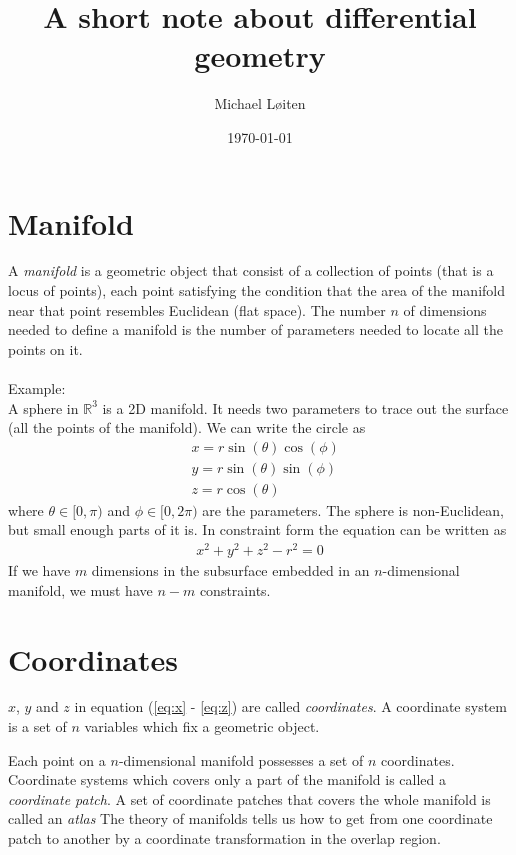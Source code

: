 \documentclass[a4paper, 12pt]{article}
\title{\vspace{-8ex}A short note about differential geometry\vspace{-1ex}}
\author{Michael L{\o}iten}
\date{\vspace{-2ex}\today}
\begin{document}
\maketitle

\section{Manifold}
A \emph{manifold} is a geometric object that consist of a collection of points 
(that is a locus of points), each point satisfying the condition that the area 
of the manifold near that point resembles Euclidean (flat space). The number $n$ 
of dimensions needed to define a manifold is the number of parameters needed to 
locate all the points on it.\\
\\
Example:\\
A sphere in $\mathbb{R}^3$ is a 2D manifold. It needs two parameters to 
trace out the surface (all the points of the manifold). We can write the circle 
as
%
\begin{align}
 &x = r\sin(\theta)\cos(\phi) \label{eq:x}\\
 &y = r\sin(\theta)\sin(\phi) \label{eq:y}\\
 &z = r\cos(\theta) \label{eq:z}
\end{align}
%
where $\theta \in [0,\pi)$ and $\phi \in [0,2\pi)$ are the parameters. The 
sphere is non-Euclidean, but small enough parts of it is. In constraint form 
the equation can be written as
%
\begin{align*}
 x^2+y^2+z^2-r^2 = 0
\end{align*}
%
If we have $m$ dimensions in the subsurface embedded in an $n$-dimensional 
manifold, we must have $n-m$ constraints.






\section{Coordinates} \label{sec:coord}
$x$, $y$ and $z$ in equation (\ref{eq:x} - \ref{eq:z}) are called 
\emph{coordinates}. A coordinate system is a set of $n$ variables which fix a 
geometric object.

Each point on a $n$-dimensional manifold possesses a set of 
$n$ coordinates. Coordinate systems which covers only a part of the manifold is 
called a \emph{coordinate patch}. A set of coordinate patches that covers the 
whole manifold is called an \emph{atlas} The theory of manifolds tells us how 
to get from one coordinate patch to another by a coordinate transformation in 
the overlap region.
\end{document}
